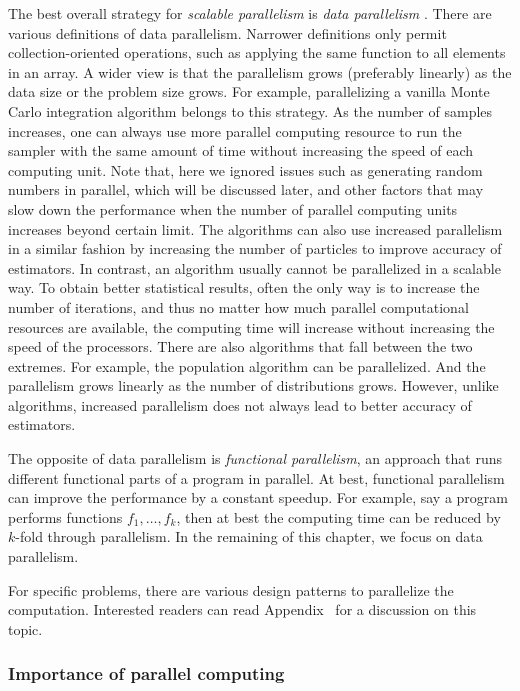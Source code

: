 The best overall strategy for \emph{scalable parallelism} is \emph{data parallelism} \cite{datapar}. There are various definitions of data parallelism. Narrower definitions only permit collection-oriented operations, such as applying the same function to all elements in an array. A wider view is that the parallelism grows (preferably linearly) as the data size or the problem size grows. For example, parallelizing a vanilla Monte Carlo integration algorithm belongs to this strategy. As the number of samples increases, one can always use more parallel computing resource to run the sampler with the same amount of time without increasing the speed of each computing unit. Note that, here we ignored issues such as generating random numbers in parallel, which will be discussed later, and other factors that may slow down the performance when the number of parallel computing units increases beyond certain limit. The \smc algorithms can also use increased parallelism in a similar fashion by increasing the number of particles to improve accuracy of estimators. In contrast, an \mcmc algorithm usually cannot be parallelized in a scalable way. To obtain better statistical results, often the only way is to increase the number of iterations, and thus no matter how much parallel computational resources are available, the computing time will increase without increasing the speed of the processors. There are also algorithms that fall between the two extremes. For example, the population \mcmc algorithm can be parallelized. And the parallelism grows linearly as the number of distributions grows. However, unlike \smc algorithms, increased parallelism does not always lead to better accuracy of estimators.

The opposite of data parallelism is \emph{functional parallelism}, an approach that runs different functional parts of a program in parallel. At best, functional parallelism can improve the performance by a constant speedup. For example, say a program performs functions $f_1,\dots,f_k$, then at best the computing time can be reduced by $k$-fold through parallelism. In the remaining of this chapter, we focus on data parallelism.

For specific problems, there are various design patterns to parallelize the computation. Interested readers can read Appendix~ for a discussion on this topic.

\subsubsection{Importance of parallel computing}
\label{ssub:Importance of parallel computing}

